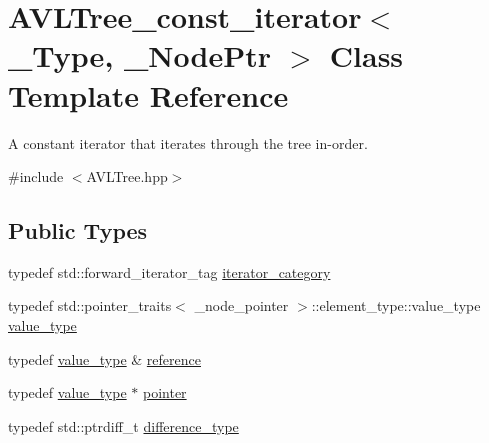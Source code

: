 \hypertarget{class_a_v_l_tree__const__iterator}{}\section{A\+V\+L\+Tree\+\_\+const\+\_\+iterator$<$ \+\_\+\+Type, \+\_\+\+Node\+Ptr $>$ Class Template Reference}
\label{class_a_v_l_tree__const__iterator}


A constant iterator that iterates through the tree in-\/order.  




{\ttfamily \#include $<$A\+V\+L\+Tree.\+hpp$>$}

\subsection*{Public Types}
\begin{DoxyCompactItemize}
\item 
typedef std\+::forward\+\_\+iterator\+\_\+tag \hyperlink{class_a_v_l_tree__const__iterator_aa2d12330a9ba748729e42d8fc882c98e}{iterator\+\_\+category}
\item 
typedef std\+::pointer\+\_\+traits$<$ \+\_\+node\+\_\+pointer $>$\+::element\+\_\+type\+::value\+\_\+type \hyperlink{class_a_v_l_tree__const__iterator_abff96c9a253b234068c5d34f7471751d}{value\+\_\+type}
\item 
typedef \hyperlink{class_a_v_l_tree__const__iterator_abff96c9a253b234068c5d34f7471751d}{value\+\_\+type} \& \hyperlink{class_a_v_l_tree__const__iterator_a60f81dd86cc602fcc95a298df957990b}{reference}
\item 
typedef \hyperlink{class_a_v_l_tree__const__iterator_abff96c9a253b234068c5d34f7471751d}{value\+\_\+type} $\ast$ \hyperlink{class_a_v_l_tree__const__iterator_a0fbfdccc80380ae68a44281dcc18e770}{pointer}
\item 
typedef std\+::ptrdiff\+\_\+t \hyperlink{class_a_v_l_tree__const__iterator_a4373b7d2f957d78030ee9dbd86fc307e}{difference\+\_\+type}
\end{DoxyCompactItemize}
